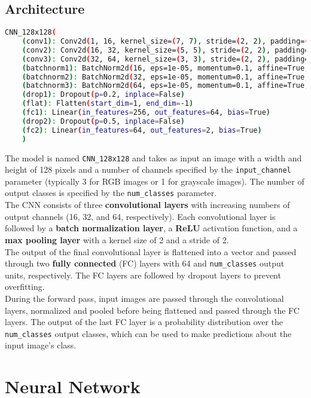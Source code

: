 \documentclass{report}
\begin{document}
\subsection{Architecture}
\begin{lstlisting}[language=bash]
CNN_128x128(
    (conv1): Conv2d(1, 16, kernel_size=(7, 7), stride=(2, 2), padding=(1, 1))
    (conv2): Conv2d(16, 32, kernel_size=(5, 5), stride=(2, 2), padding=(1, 1))
    (conv3): Conv2d(32, 64, kernel_size=(3, 3), stride=(2, 2), padding=(1, 1))
    (batchnorm1): BatchNorm2d(16, eps=1e-05, momentum=0.1, affine=True, track_running_stats=True)
    (batchnorm2): BatchNorm2d(32, eps=1e-05, momentum=0.1, affine=True, track_running_stats=True)
    (batchnorm3): BatchNorm2d(64, eps=1e-05, momentum=0.1, affine=True, track_running_stats=True)
    (drop1): Dropout(p=0.2, inplace=False)
    (flat): Flatten(start_dim=1, end_dim=-1)
    (fc1): Linear(in_features=256, out_features=64, bias=True)
    (drop2): Dropout(p=0.5, inplace=False)
    (fc2): Linear(in_features=64, out_features=2, bias=True)
    )
\end{lstlisting}
The model is named \texttt{CNN\_128x128} and takes as input an image with a width and height of 128 pixels and a number of channels specified by the \texttt{input\_channel} parameter 
(typically 3 for RGB images or 1 for grayscale images). The number of output classes is specified by the \texttt{num\_classes} parameter.\\
The CNN consists of three \textbf{convolutional layers} with increasing numbers of output channels (16, 32, and 64, respectively). Each convolutional layer is followed by a \textbf{batch normalization layer},
 a \textbf{ReLU} activation function, and a \textbf{max pooling layer} with a kernel size of 2 and a stride of 2. \\
The output of the final convolutional layer is flattened into a vector and passed through two \textbf{fully connected} (FC) layers with 64 and \texttt{num\_classes} output units, respectively.
 The FC layers are followed by dropout layers to prevent overfitting.\\
 
During the forward pass, input images are passed through the convolutional layers, normalized and pooled before being flattened and passed through the FC layers.
 The output of the last FC layer is a probability distribution over the \texttt{num\_classes} output classes, which can be used to make predictions about the input image's class.


\section{Neural Network}
\end{document}
